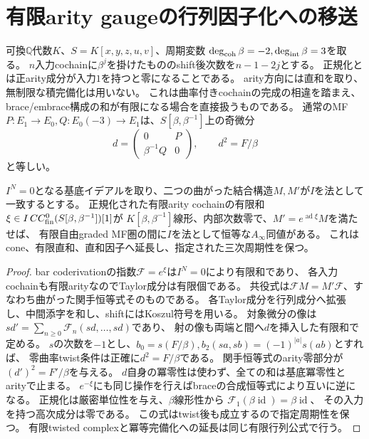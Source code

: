 \section{有限arity gaugeの行列因子化への移送}
可換$\mathbb Q$代数$K$、$S=K[x,y,z,u,v]$、周期変数
$\deg_{\rm coh}\beta=-2,\deg_{\rm int}\beta=3$を取る。
$n$入力cochainに$\beta^j$を掛けたもののshift後次数を$n-1-2j$とする。
正規化とは正arity成分が入力$1$を持つと零になることである。
arity方向には直和を取り、無制限な積完備化は用いない。
これは曲率付きcochainの完成の相違\cite{CT}を踏まえ、brace/embrace構成\cite{Lowen}の和が有限になる場合を直接扱うものである。
通常のMF $P:E_1\to E_0,Q:E_0(-3)\to E_1$は、$S[\beta,\beta^{-1}]$上の奇微分
\[
 d=\begin{pmatrix}0&P\\\beta^{-1}Q&0\end{pmatrix},\qquad d^2=F/\beta
\]
と等しい。
\begin{lemma}[有限移送]\label{mix:finite}
$I^N=0$となる基底イデアルを取り、二つの曲がった結合構造$M,M'$が$I$を法として一致するとする。
正規化された有限arity cochainの有限和$\xi\in I\,CC^0_{\rm fin}(S[\beta,\beta^{-1}])[1]$が
$K[\beta,\beta^{-1}]$線形、内部次数零で、$M'=e^{\operatorname{ad}\xi}M$を満たせば、
有限自由graded MF圏の間に$I$を法として恒等な$A_\infty$同値がある。
これはcone、有限直和、直和因子へ延長し、指定された三次周期性を保つ。
\end{lemma}
\begin{proof}
bar coderivationの指数$\mathcal F=e^\xi$は$I^N=0$により有限和であり、
各入力cochainも有限arityなのでTaylor成分は有限個である。
共役式は$\mathcal F M=M'\mathcal F$、すなわち曲がった関手恒等式そのものである。
各Taylor成分を行列成分へ拡張し、中間添字を和し、shiftにはKoszul符号を用いる。
対象微分の像は$s d'=\sum_{n\ge0}\mathcal F_n(sd,\ldots,sd)$であり、
射の像も両端と間へ$d$を挿入した有限和で定める。
$s$の次数を$-1$とし、$b_0=s(F/\beta),b_2(sa,sb)=(-1)^{|a|}s(ab)$とすれば、
零曲率twist条件は正確に$d^2=F/\beta$である。
関手恒等式のarity零部分が$(d')^2=F'/\beta$を与える。
$d$自身の冪零性は使わず、全ての和は基底冪零性とarityで止まる。
$e^{-\xi}$にも同じ操作を行えばbraceの合成恒等式により互いに逆になる。
正規化は厳密単位性を与え、$\beta$線形性から
$\mathcal F_1(\beta\operatorname{id})=\beta\operatorname{id}$、
その入力を持つ高次成分は零である。
この式はtwist後も成立するので指定周期性を保つ。
有限twisted complexと冪等完備化への延長は同じ有限行列公式で行う。
\end{proof}

